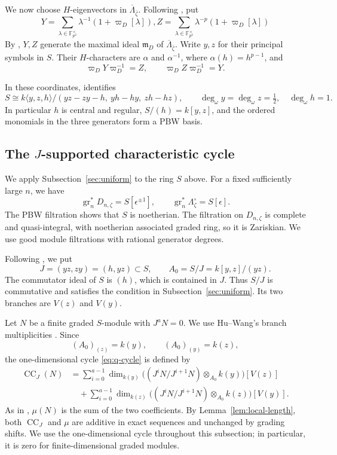\documentclass[11pt]{article}
\theoremstyle{definition}
\newcommand{\mD}{\mathfrak m_D}
\newcommand{\gr}{\operatorname{gr}}
\newcommand{\CC}{\operatorname{CC}}
\begin{document}
We now choose $H$-eigenvectors in $\overline\Lambda_{\bar\zeta}$.
Following \cite[\S2.3]{HuWangModP}, put
\[Y=\sum_{\lambda\in\mathbb{F}_{p^2}^\times}\lambda^{-1}(1+\varpi_D[\lambda]), Z=\sum_{\lambda\in\mathbb{F}_{p^2}^\times}\lambda^{-p}(1+\varpi_D[\lambda])\]
By \cite[Lemma~2.7]{HuWangModP}, $Y,Z$ generate the maximal
ideal $\mD$ of $\overline\Lambda_{\bar\zeta}$.
Write $y,z$ for their principal symbols in $S$.
Their $H$-characters are $\alpha$ and $\alpha^{-1}$, where
$\alpha(h)=h^{p-1}$, and
\[
 \varpi_DY\varpi_D^{-1}=Z,
 \qquad
 \varpi_DZ\varpi_D^{-1}=Y.
\]

In these coordinates, \cite[\S2.3]{HuWangPadic} identifies
\[
 S\cong k\langle y,z,h\rangle/
       (yz-zy-h,\ yh-hy,\ zh-hz),\qquad
 \deg_\omega y=\deg_\omega z=\tfrac12,\quad\deg_\omega h=1.
\]
In particular $h$ is central and regular, $S/(h)=k[y,z]$, and the
ordered monomials in the three generators form a PBW basis.


\subsection{The \texorpdfstring{$J$}{J}-supported characteristic cycle}
\label{sec:quaternionic}
We apply Subsection~\ref{sec:uniform} to the ring $S$ above.
For a fixed sufficiently large $n$, we have
\[
 \gr_n^*D_{n,\zeta}=S[\epsilon^{\pm1}],\qquad
 \gr_n^*\Lambda_\zeta^\circ=S[\epsilon].
\]
The PBW filtration shows that $S$ is noetherian. The filtration
on $D_{n,\zeta}$ is complete and quasi-integral, with noetherian
associated graded ring, so it is Zariskian. We use good module
filtrations with rational generator degrees.

Following \cite[\S3]{HuWangPadic}, we put
\[
 J=(yz,zy)=(h,yz)\subset S,\qquad
 A_0=S/J=k[y,z]/(yz).
\]
The commutator ideal of $S$ is $(h)$, which is contained in $J$.
Thus $S/J$ is commutative and satisfies the condition in Subsection~\ref{sec:uniform}.
Its two branches are $V(z)$ and $V(y)$.

Let $N$ be a finite graded $S$-module with $J^aN=0$.
We use Hu--Wang's branch multiplicities
\cite[\S3.2, equation (3.2)]{HuWangPadic}. Since
\[
 (A_0)_{(z)}=k(y),\qquad (A_0)_{(y)}=k(z),
\]
the one-dimensional cycle \eqref{eq:q-cycle} is defined by
\begin{align}
 \CC_J(N)
 &=\sum_{i=0}^{a-1}
   \dim_{k(y)}\bigl((J^iN/J^{i+1}N)\otimes_{A_0}k(y)\bigr)[V(z)]
 \label{eq:D-cycle}\\
 &\quad+\sum_{i=0}^{a-1}
   \dim_{k(z)}\bigl((J^iN/J^{i+1}N)\otimes_{A_0}k(z)\bigr)[V(y)].
 \nonumber
\end{align}
As in \cite{HuWangPadic}, $\mu(N)$ is the sum of the two coefficients.
By Lemma~\ref{lem:local-length}, both $\CC_J$ and $\mu$ are
additive in exact sequences and unchanged by grading shifts.
We use the one-dimensional cycle throughout this subsection;
in particular, it is zero for finite-dimensional graded modules.
\end{document}

